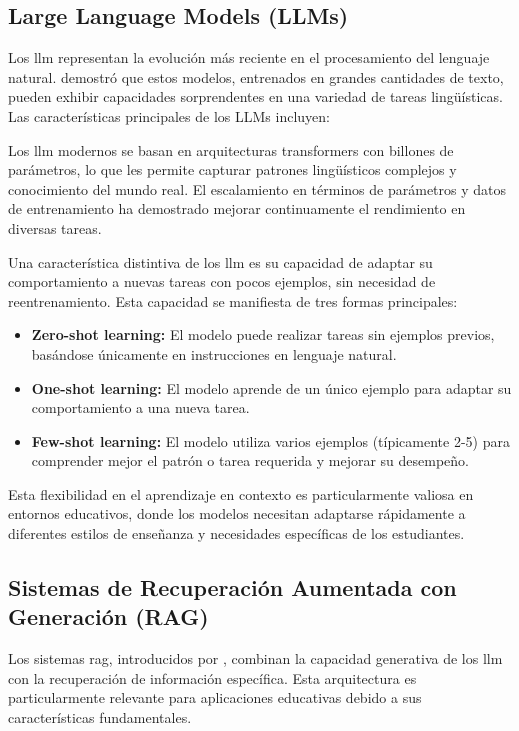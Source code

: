 \subsection{Large Language Models (LLMs)}

Los \gls{llm} representan la evolución más reciente en el procesamiento del lenguaje natural. \cite{brown2020language} demostró que estos modelos, entrenados en grandes cantidades de texto, pueden exhibir capacidades sorprendentes en una variedad de tareas lingüísticas. Las características principales de los LLMs incluyen:

Los \gls{llm} modernos se basan en arquitecturas \gls{transformers} con billones de parámetros, lo que les permite capturar patrones lingüísticos complejos y conocimiento del mundo real. El escalamiento en términos de parámetros y datos de entrenamiento ha demostrado mejorar continuamente el rendimiento en diversas tareas.

Una característica distintiva de los \gls{llm} es su capacidad de adaptar su comportamiento a nuevas tareas con pocos ejemplos, sin necesidad de reentrenamiento. Esta capacidad se manifiesta de tres formas principales:

\begin{itemize}
  \item \textbf{Zero-shot learning:} El modelo puede realizar tareas sin ejemplos previos, basándose únicamente en instrucciones en lenguaje natural.

  \item \textbf{One-shot learning:} El modelo aprende de un único ejemplo para adaptar su comportamiento a una nueva tarea.

  \item \textbf{Few-shot learning:} El modelo utiliza varios ejemplos (típicamente 2-5) para comprender mejor el patrón o tarea requerida y mejorar su desempeño.
\end{itemize}

Esta flexibilidad en el aprendizaje en contexto es particularmente valiosa en entornos educativos, donde los modelos necesitan adaptarse rápidamente a diferentes estilos de enseñanza y necesidades específicas de los estudiantes.

\subsection{Sistemas de Recuperación Aumentada con Generación (RAG)}

Los sistemas \gls{rag}, introducidos por \cite{lewis2020retrieval}, combinan la capacidad generativa de los \gls{llm} con la recuperación de información específica. Esta arquitectura es particularmente relevante para aplicaciones educativas debido a sus características fundamentales.

